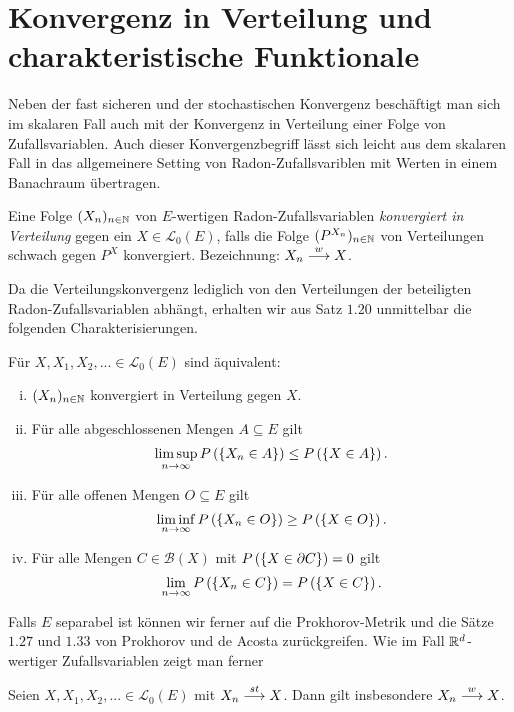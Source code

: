 \section{Konvergenz in Verteilung und charakteristische Funktionale}
Neben der fast sicheren und der stochastischen Konvergenz beschäftigt man sich im skalaren Fall auch mit der Konvergenz in Verteilung einer Folge von Zufallsvariablen. 
Auch dieser Konvergenzbegriff lässt sich leicht aus dem skalaren Fall in das allgemeinere Setting von Radon-Zufallsvariblen mit Werten in einem Banachraum übertragen. 
\begin{mydef}
    Eine Folge $(X_n)_{n \in \mathbb{N}}$ von $E$-wertigen Radon-Zufallsvariablen \textit{konvergiert in Verteilung} gegen ein $X \in \mathcal{L}_0(E)$,
    falls die Folge $(P^{X_n})_{n \in \mathbb{N}}$ von Verteilungen schwach gegen $P^X$ konvergiert. 
    \newline 
    Bezeichnung: $X_n \overset{w}{\longrightarrow} X$. 
\end{mydef}

Da die Verteilungskonvergenz lediglich von den Verteilungen der beteiligten Radon-Zufallsvariablen abhängt, erhalten wir aus Satz $1.20$ unmittelbar die folgenden Charakterisierungen.
\begin{proposition}
    Für $X,X_1,X_2,... \in \mathcal{L}_0(E)$ sind äquivalent:
    \begin{enumerate}[(i)]
        \item $(X_n)_{n \in \mathbb{N}}$ konvergiert in Verteilung gegen $X$. 
        \item Für alle abgeschlossenen Mengen $A \subseteq E$ gilt 
        $$
            \limsup_{n \to \infty}P\left(\left\{ X_n \in A \right\}\right) \leq P\left(\left\{ X \in A \right\}\right).
        $$
        \item Für alle offenen Mengen $O \subseteq E$ gilt
        $$
            \liminf_{n \to \infty}P\left(\left\{ X_n \in O \right\}\right) \geq P\left(\left\{ X \in O \right\}\right).
        $$
        \item Für alle Mengen $C \in \mathcal{B}(X)$ mit $P\left(\left\{ X \in \partial C \right\}\right) = 0$ gilt 
        $$
            \lim_{n \to \infty}P\left(\left\{ X_n \in C \right\}\right) = P\left(\left\{ X \in C \right\}\right). 
        $$
    \end{enumerate}
\end{proposition}

Falls $E$ separabel ist können wir ferner auf die Prokhorov-Metrik und die Sätze $1.27$ und $1.33$ von Prokhorov und de Acosta zurückgreifen. Wie im Fall $\mathbb{R}^d$-wertiger Zufallsvariablen zeigt man ferner 
\begin{proposition}
    Seien $X,X_1,X_2,... \in \mathcal{L}_0(E)$ mit $X_n \overset{st}{\longrightarrow} X$. Dann gilt insbesondere $X_n \overset{w}{\longrightarrow} X$. 
\end{proposition}\ 
\newline




